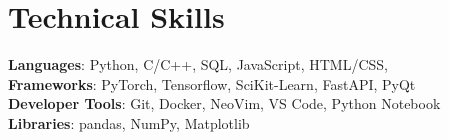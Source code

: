 \documentclass[letterpaper,11pt]{article}
\begin{document}
\section{Technical Skills}
 \begin{itemize}[leftmargin=0.15in, label={}]
    \small{\item{
     \textbf{Languages}{: Python, C/C++, SQL, JavaScript, HTML/CSS, } \\
     \textbf{Frameworks}{: PyTorch, Tensorflow, SciKit-Learn, FastAPI, PyQt} \\
     \textbf{Developer Tools}{: Git, Docker, NeoVim, VS Code, Python Notebook}  \\
     \textbf{Libraries}{: pandas, NumPy, Matplotlib} }}
 \end{itemize}

\end{document}
